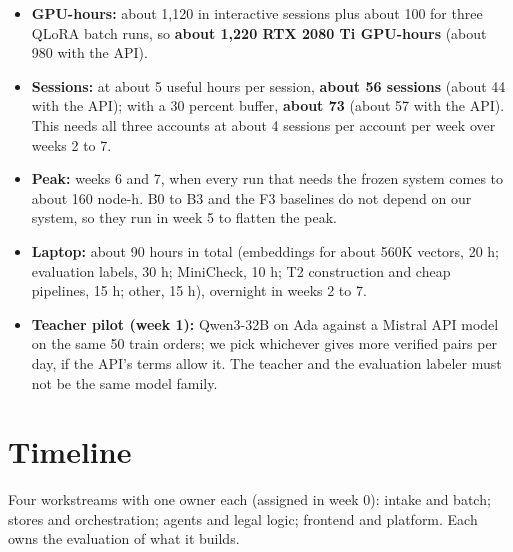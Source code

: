\documentclass[10pt,a4paper]{article}
\begin{document}
\begin{itemize}
\item \textbf{GPU-hours:} about 1,120 in interactive sessions plus about 100 for three QLoRA batch runs, so \textbf{about 1,220 RTX 2080 Ti GPU-hours} (about 980 with the API).
\item \textbf{Sessions:} at about 5 useful hours per session, \textbf{about 56 sessions} (about 44 with the API); with a 30 percent buffer, \textbf{about 73} (about 57 with the API). This needs all three accounts at about 4 sessions per account per week over weeks 2 to 7.
\item \textbf{Peak:} weeks 6 and 7, when every run that needs the frozen system comes to about 160 node-h. B0 to B3 and the F3 baselines do not depend on our system, so they run in week 5 to flatten the peak.
\item \textbf{Laptop:} about 90 hours in total (embeddings for about 560K vectors, 20 h; evaluation labels, 30 h; MiniCheck, 10 h; T2 construction and cheap pipelines, 15 h; other, 15 h), overnight in weeks 2 to 7.
\item \textbf{Teacher pilot (week 1):} Qwen3-32B on Ada against a Mistral API model on the same 50 train orders; we pick whichever gives more verified pairs per day, if the API's terms allow it. The teacher and the evaluation labeler must not be the same model family.
\end{itemize}

\section{Timeline}

Four workstreams with one owner each (assigned in week 0): intake and batch; stores and orchestration; agents and legal logic; frontend and platform. Each owns the evaluation of what it builds.
\end{document}
